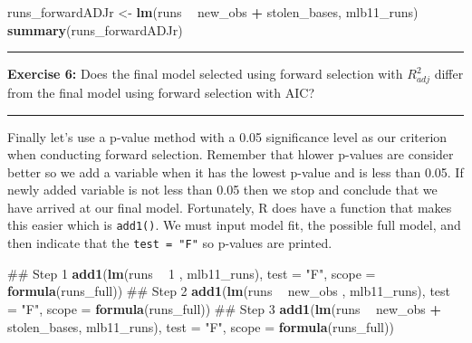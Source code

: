 \documentclass[]{book}
\newenvironment{Shaded}{\begin{snugshade}}{\end{snugshade}}
\newcommand{\DataTypeTok}[1]{\textcolor[rgb]{0.13,0.29,0.53}{#1}}
\newcommand{\DecValTok}[1]{\textcolor[rgb]{0.00,0.00,0.81}{#1}}
\newcommand{\KeywordTok}[1]{\textcolor[rgb]{0.13,0.29,0.53}{\textbf{#1}}}
\newcommand{\NormalTok}[1]{#1}
\newcommand{\OperatorTok}[1]{\textcolor[rgb]{0.81,0.36,0.00}{\textbf{#1}}}
\newcommand{\StringTok}[1]{\textcolor[rgb]{0.31,0.60,0.02}{#1}}
\theoremstyle{definition}
\theoremstyle{definition}
\theoremstyle{definition}
\theoremstyle{remark}
\begin{document}
\begin{Shaded}
\begin{Highlighting}[]
\NormalTok{runs_forwardADJr <-}\StringTok{ }\KeywordTok{lm}\NormalTok{(runs }\OperatorTok{~}\StringTok{ }\NormalTok{new_obs }\OperatorTok{+}\StringTok{ }\NormalTok{stolen_bases, mlb11_runs)}
\KeywordTok{summary}\NormalTok{(runs_forwardADJr)}
\end{Highlighting}
\end{Shaded}

\begin{center}\rule{0.5\linewidth}{\linethickness}\end{center}

\textbf{Exercise 6:} Does the final model selected using forward
selection with \(R^2_{adj}\) differ from the final model using forward
selection with AIC?

\begin{center}\rule{0.5\linewidth}{\linethickness}\end{center}

Finally let's use a p-value method with a 0.05 significance level as our
criterion when conducting forward selection. Remember that hlower
p-values are consider better so we add a variable when it has the lowest
p-value and is less than 0.05. If newly added variable is not less than
0.05 then we stop and conclude that we have arrived at our final model.
Fortunately, R does have a function that makes this easier which is
\texttt{add1()}. We must input model fit, the possible full model, and
then indicate that the \texttt{test\ =\ "F"} so p-values are printed.

\begin{Shaded}
\begin{Highlighting}[]
\NormalTok{## Step 1}
\KeywordTok{add1}\NormalTok{(}\KeywordTok{lm}\NormalTok{(runs }\OperatorTok{~}\StringTok{ }\DecValTok{1}\NormalTok{ , mlb11_runs), }\DataTypeTok{test =} \StringTok{"F"}\NormalTok{, }\DataTypeTok{scope =} \KeywordTok{formula}\NormalTok{(runs_full))}
\NormalTok{## Step 2}
\KeywordTok{add1}\NormalTok{(}\KeywordTok{lm}\NormalTok{(runs }\OperatorTok{~}\StringTok{ }\NormalTok{new_obs , mlb11_runs), }\DataTypeTok{test =} \StringTok{"F"}\NormalTok{, }\DataTypeTok{scope =} \KeywordTok{formula}\NormalTok{(runs_full))}
\NormalTok{## Step 3}
\KeywordTok{add1}\NormalTok{(}\KeywordTok{lm}\NormalTok{(runs }\OperatorTok{~}\StringTok{ }\NormalTok{new_obs }\OperatorTok{+}\StringTok{ }\NormalTok{stolen_bases, mlb11_runs), }\DataTypeTok{test =} \StringTok{"F"}\NormalTok{, }\DataTypeTok{scope =} \KeywordTok{formula}\NormalTok{(runs_full))}
\end{Highlighting}
\end{Shaded}
\end{document}
